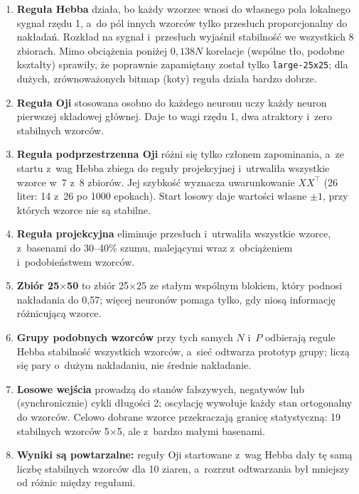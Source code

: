 \documentclass[11pt,a4paper]{article}
\begin{document}
\begin{enumerate}
  \item \textbf{Reguła Hebba} działa, bo każdy wzorzec wnosi do własnego pola lokalnego sygnał
  rzędu 1, a~do pól innych wzorców tylko przesłuch proporcjonalny do nakładań. Rozkład na sygnał
  i~przesłuch wyjaśnił stabilność we wszystkich 8 zbiorach. Mimo obciążenia poniżej $0{,}138N$
  korelacje (wspólne tło, podobne kształty) sprawiły, że poprawnie zapamiętany został tylko
  \texttt{large-25x25}; dla dużych, zrównoważonych bitmap (koty) reguła działa bardzo dobrze.
  \item \textbf{Reguła Oji} stosowana osobno do każdego neuronu uczy każdy neuron pierwszej
  składowej głównej. Daje to wagi rzędu 1, dwa atraktory i~zero stabilnych wzorców.
  \item \textbf{Reguła podprzestrzenna Oji} różni się tylko członem zapominania, a~ze startu
  z~wag Hebba zbiega do reguły projekcyjnej i~utrwaliła wszystkie wzorce w~7 z~8 zbiorów. Jej
  szybkość wyznacza uwarunkowanie $XX^\top$ (26 liter: 14 z~26 po 1000 epokach). Start losowy
  daje wartości własne $\pm1$, przy których wzorce nie są stabilne.
  \item \textbf{Reguła projekcyjna} eliminuje przesłuch i~utrwaliła wszystkie wzorce, z~basenami
  do 30--40\% szumu, malejącymi wraz z~obciążeniem i~podobieństwem wzorców.
  \item \textbf{Zbiór 25$\times$50} to zbiór 25$\times$25 ze stałym wspólnym blokiem, który
  podnosi nakładania do 0{,}57; więcej neuronów pomaga tylko, gdy niosą informację różnicującą
  wzorce.
  \item \textbf{Grupy podobnych wzorców} przy tych samych $N$ i~$P$ odbierają regule Hebba
  stabilność wszystkich wzorców, a~sieć odtwarza prototyp grupy; liczą się pary o~dużym
  nakładaniu, nie średnie nakładanie.
  \item \textbf{Losowe wejścia} prowadzą do stanów fałszywych, negatywów lub (synchronicznie)
  cykli długości 2; oscylację wywołuje każdy stan ortogonalny do wzorców. Celowo dobrane wzorce
  przekraczają granicę statystyczną: 19 stabilnych wzorców 5$\times$5, ale z~bardzo małymi
  basenami.
  \item \textbf{Wyniki są powtarzalne:} reguły Oji startowane z~wag Hebba dały tę samą liczbę
  stabilnych wzorców dla 10 ziaren, a~rozrzut odtwarzania był mniejszy od różnic między regułami.
\end{enumerate}

\printbibliography[heading=bibintoc,title={Bibliografia}]
\end{document}
